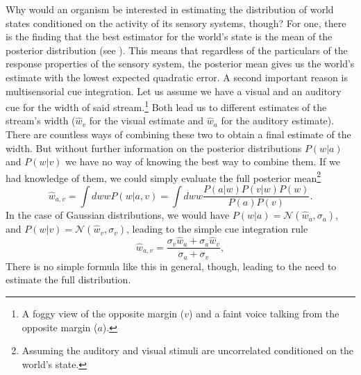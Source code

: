 Why would an organism be interested in estimating the distribution of world states conditioned on the activity of its sensory systems, though? For one, there is
the finding that the best estimator for the world's state is the mean of the posterior distribution (see ). This means that regardless of the particulars
of the response properties of the sensory system, the posterior mean gives us the world's estimate with the lowest expected quadratic error. A second important
reason is multisensorial cue integration. Let us assume we have a visual and an auditory cue for the width of said stream.\footnote{A foggy view of the opposite 
margin ($v$) and a faint voice talking from the opposite margin ($a$).} Both lead us to different estimates of the stream's width ($\hat{w}_v$ for the visual estimate 
and $\hat{w}_a$ for the auditory estimate). There are countless ways of combining these two to obtain a final estimate of the width. But without further information
on the posterior distributions $P(w|a)$ and $P(w|v)$ we have no way of knowing the best way to combine them. If we had knowledge of them, we could simply
evaluate the full posterior mean\footnote{Assuming the auditory and visual stimuli are uncorrelated conditioned on the world's state.}
\[
\hat{w}_{a,v} = \int dw w P(w|a,v) = \int dw w \frac{P(a|w)P(v|w)P(w)}{P(a)P(v)}.
\]
In the case of Gaussian distributions, we would have $P(w|a) = \mathcal{N}(\hat{w}_a,\sigma_a)$, and $P(w|v) = \mathcal{N}(\hat{w}_v,\sigma_v)$, leading to the simple
cue integration rule
\[
\hat{w}_{a,v} = \frac{\sigma_v \hat{w}_a + \sigma_a \hat{w}_v}{\sigma_a + \sigma_v},
\]
There is no simple formula like this in general, though, leading to the need to estimate the full distribution.
\par


